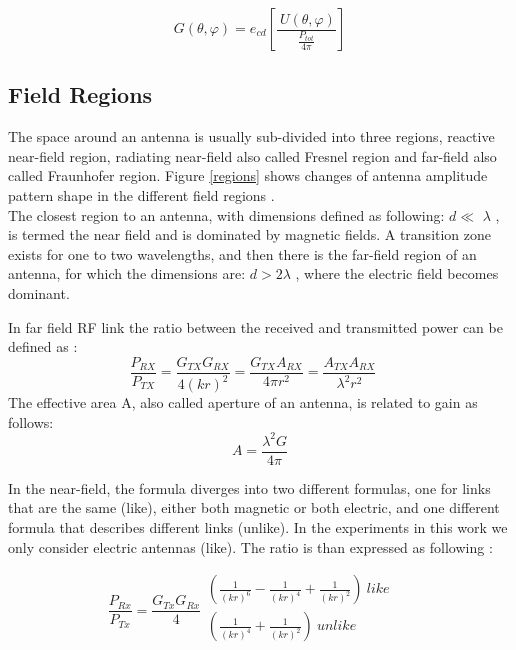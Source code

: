 \begin{equation}
G \left(  \theta , \varphi  \right) =e_{cd} \left[ \frac{~U \left(  \theta , \varphi  \right) }{\frac{P_{tot}}{4 \pi }} \right]
\end{equation}



\subsection{Field Regions}
The space around an antenna is usually sub-divided into three regions, reactive near-field region, radiating near-field also called Fresnel region and far-field also called Fraunhofer region. Figure \ref{regions} shows changes of antenna amplitude pattern shape in the different field regions \cite{7942128}. \\

The closest region to an antenna, with dimensions defined as following: $d \ll $ $ \lambda $  , is termed the near field and is dominated by magnetic fields. A transition zone exists for one to two wavelengths, and then there is the far-field region of an antenna, for which the dimensions are: $d>2\lambda $  , where the electric field becomes dominant.

In far field \acs{RF} link the ratio between the received and transmitted power can be defined as \cite{schantz}:
\begin{equation}
\frac{P_{RX}}{P_{TX}}=\frac{G_{TX}G_{RX}}{4 \left( kr \right) ^{2}}=\frac{G_{TX}A_{RX}}{4 \pi r^{2}}=\frac{A_{TX}A_{RX}}{ \lambda ^{2}r^{2}} \quad %
\end{equation}
The effective area A, also called aperture of an antenna, is related to gain as follows: 
\begin{equation}
A=\frac{ \lambda ^{2}G}{4 \pi }
\end{equation}

In the near-field, the formula diverges into two different formulas, one for links that are the same (like), either both magnetic or both electric, and one different formula that describes different links (unlike). In the experiments in this work we only consider electric antennas (like). The ratio is than expressed as following \cite{schantz}:

\begin{equation} \label{eq:near}
\frac{P_{Rx}}{P_{Tx}}=\frac{G_{Tx}G_{Rx}}{4} \begin{array}{c}
	 \left( \frac{1}{ \left( kr \right) ^{6}}-\frac{1}{ \left( kr \right) ^{4}}+\frac{1}{ \left( kr \right) ^{2}} \right) ~like~\\
	 \left( \frac{1}{ \left( kr \right) ^{4}}+\frac{1}{ \left( kr \right) ^{2}} \right) ~unlike\\
	\end{array} \quad %
\end{equation}

